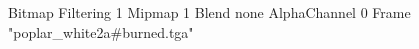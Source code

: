 {Bitmap
	{Filtering 1}
	{Mipmap 1}
	{Blend none}
	{AlphaChannel 0}
	{Frame "poplar_white2a#burned.tga"}
}

